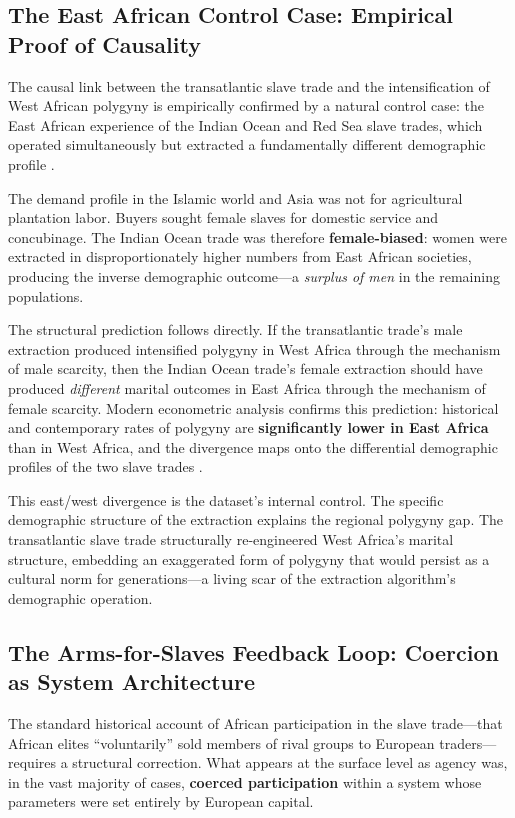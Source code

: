 \subsection{The East African Control Case: Empirical Proof of Causality}
\label{sec:east_africa}

The causal link between the transatlantic slave trade and the intensification of West African polygyny is empirically confirmed by a natural control case: the East African experience of the Indian Ocean and Red Sea slave trades, which operated simultaneously but extracted a fundamentally different demographic profile \cite{fenske_polygyny, slave_trade_polygyny_mpra}.

The demand profile in the Islamic world and Asia was not for agricultural plantation labor. Buyers sought female slaves for domestic service and concubinage. The Indian Ocean trade was therefore \textbf{female-biased}: women were extracted in disproportionately higher numbers from East African societies, producing the inverse demographic outcome---a \textit{surplus of men} in the remaining populations.

The structural prediction follows directly. If the transatlantic trade's male extraction produced intensified polygyny in West Africa through the mechanism of male scarcity, then the Indian Ocean trade's female extraction should have produced \textit{different} marital outcomes in East Africa through the mechanism of female scarcity. Modern econometric analysis confirms this prediction: historical and contemporary rates of polygyny are \textbf{significantly lower in East Africa} than in West Africa, and the divergence maps onto the differential demographic profiles of the two slave trades \cite{fenske_polygyny}.

This east/west divergence is the dataset's internal control. The specific demographic structure of the extraction explains the regional polygyny gap. The transatlantic slave trade structurally re-engineered West Africa's marital structure, embedding an exaggerated form of polygyny that would persist as a cultural norm for generations---a living scar of the extraction algorithm's demographic operation.

\subsection{The Arms-for-Slaves Feedback Loop: Coercion as System Architecture}
\label{sec:arms_slaves}

The standard historical account of African participation in the slave trade---that African elites ``voluntarily'' sold members of rival groups to European traders---requires a structural correction. What appears at the surface level as agency was, in the vast majority of cases, \textbf{coerced participation} within a system whose parameters were set entirely by European capital.

